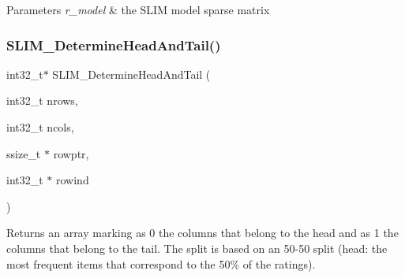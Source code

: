 \begin{DoxyParams}{Parameters}
{\em r\+\_\+model} & the S\+L\+IM model sparse matrix \\
\hline
\end{DoxyParams}
\mbox{\label{group__slimapi_ga05d2e5468a86da7251b57f4289701401}} 
\subsubsection{\texorpdfstring{SLIM\_DetermineHeadAndTail()}{SLIM\_DetermineHeadAndTail()}}
{\footnotesize\ttfamily int32\+\_\+t$\ast$ S\+L\+I\+M\+\_\+\+Determine\+Head\+And\+Tail (\begin{DoxyParamCaption}\item[{int32\+\_\+t}]{nrows,  }\item[{int32\+\_\+t}]{ncols,  }\item[{ssize\+\_\+t $\ast$}]{rowptr,  }\item[{int32\+\_\+t $\ast$}]{rowind }\end{DoxyParamCaption})}



Returns an array marking as 0 the columns that belong to the head and as 1 the columns that belong to the tail. The split is based on an 50-\/50 split (head\+: the most frequent items that correspond to the 50\% of the ratings). 

